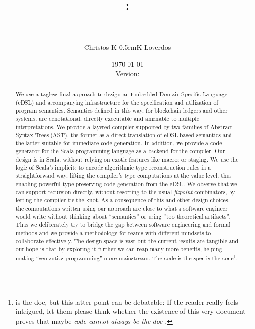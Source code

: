 \documentclass[11pt]{article}
\title{\TheTitleA:\\
{\smaller \TheTitleB}\\
\vspace{0.25\baselineskip}
\smaller[2] \textit{\TheOneSpec}}
\author{Christos {K{\kern-0.5em}K} Loverdos}
\date{\today\\
Version: \texttt{\smaller}
}
\begin{document}
\maketitle

\begin{tcolorbox}[beamer,enhanced,colback=white,boxrule=0.2pt]
\begin{abstract}
We use a tagless-final approach to design an Embedded Domain-Specific 
Language (eDSL) and accompanying infrastructure for the specification and 
utilization of program semantics. Semantics defined in this way, for 
blockchain ledgers and other systems, are denotational, directly executable 
and amenable to multiple interpretations. We provide a layered compiler 
supported by two families of Abstract Syntax Trees (AST), the former as a 
direct translation of eDSL-based semantics and the latter suitable for 
immediate code generation. In addition, we provide a code generator for the 
Scala programming language as a backend for the compiler. Our design is in 
Scala, without relying on exotic features like macros or staging. We use the 
logic of Scala's implicits to encode algorithmic type reconstruction rules in 
a straightforward way, lifting the compiler's type computations at the value 
level, thus enabling powerful type-preserving code generation from the eDSL. 
We observe that we can support recursion directly, without resorting to the 
usual \textit{fixpoint} combinators, by letting the compiler tie the knot. As 
a consequence of this and other design choices, the computations written 
using our approach are close to what a software engineer would write without 
thinking about ``semantics'' or using ``too theoretical artifacts''. Thus we 
deliberately try to bridge the gap between software engineering and formal 
methods and we provide a methodology for teams with different mindsets to 
collaborate effectively. The design space is vast but the current results are 
tangible and our hope is that by exploring it further we can reap many more 
benefits, helping making ``semantics programming'' more mainstream. The code 
is the spec is the code\footnote{is the doc, but this latter point can be 
debatable: If the reader really feels intrigued, let them please think 
whether the existence of this very document proves that maybe \textit{code 
cannot always be the doc \faLightbulbO}.}.

\end{abstract}
\end{tcolorbox}
\end{document}
